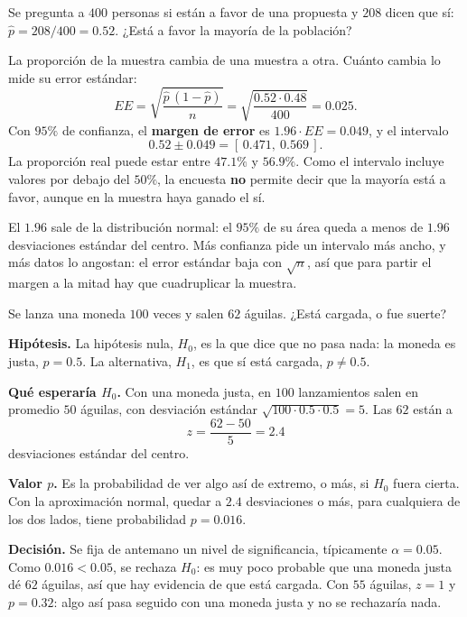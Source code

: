 \documentclass[11pt,letterpaper]{article}
\begin{document}
\begin{ejemplo}
    Se pregunta a $400$ personas si están a favor de una propuesta y
    $208$ dicen que sí: $\hat{p} = 208/400 = 0.52$. ¿Está a favor la
    mayoría de la población?

    La proporción de la muestra cambia de una muestra a otra. Cuánto
    cambia lo mide su error estándar:
    \[
        EE = \sqrt{\frac{\hat{p}\,(1 - \hat{p})}{n}}
           = \sqrt{\frac{0.52 \cdot 0.48}{400}} = 0.025 .
    \]
    Con $95\%$ de confianza, el \textbf{margen de error} es
    $1.96 \cdot EE = 0.049$, y el intervalo
    \[
        0.52 \pm 0.049 = [\,0.471,\ 0.569\,] .
    \]
    La proporción real puede estar entre $47.1\%$ y $56.9\%$. Como el
    intervalo incluye valores por debajo del $50\%$, la encuesta
    \textbf{no} permite decir que la mayoría está a favor, aunque en
    la muestra haya ganado el sí.
\end{ejemplo}

El $1.96$ sale de la distribución normal: el $95\%$ de su área queda a
menos de $1.96$ desviaciones estándar del centro. Más confianza pide
un intervalo más ancho, y más datos lo angostan: el error estándar
baja con $\sqrt{n}$, así que para partir el margen a la mitad hay que
cuadruplicar la muestra.

\begin{ejemplo}
    Se lanza una moneda $100$ veces y salen $62$ águilas. ¿Está
    cargada, o fue suerte?

    \textbf{Hipótesis.} La hipótesis nula, $H_0$, es la que dice que
    no pasa nada: la moneda es justa, $p = 0.5$. La alternativa,
    $H_1$, es que sí está cargada, $p \neq 0.5$.

    \textbf{Qué esperaría $H_0$.} Con una moneda justa, en $100$
    lanzamientos salen en promedio $50$ águilas, con desviación
    estándar $\sqrt{100 \cdot 0.5 \cdot 0.5} = 5$. Las $62$ están a
    \[
        z = \frac{62 - 50}{5} = 2.4
    \]
    desviaciones estándar del centro.

    \textbf{Valor $p$.} Es la probabilidad de ver algo así de
    extremo, o más, si $H_0$ fuera cierta. Con la aproximación normal,
    quedar a $2.4$ desviaciones o más, para cualquiera de los dos
    lados, tiene probabilidad $p = 0.016$.

    \textbf{Decisión.} Se fija de antemano un nivel de significancia,
    típicamente $\alpha = 0.05$. Como $0.016 < 0.05$, se rechaza
    $H_0$: es muy poco probable que una moneda justa dé $62$ águilas,
    así que hay evidencia de que está cargada. Con $55$ águilas,
    $z = 1$ y $p = 0.32$: algo así pasa seguido con una moneda justa y
    no se rechazaría nada.
\end{ejemplo}
\end{document}
